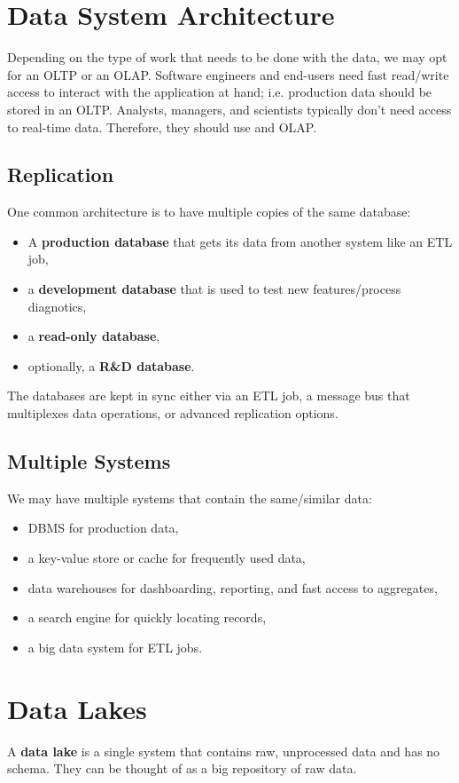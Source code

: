 \documentclass{report}
\newenvironment{definition}[1]{\begin{tcolorbox}[title={Definition: #1}]}{\end{tcolorbox}}
\renewcommand{\bf}[1]{\textbf{{#1}}}
\begin{document}
\section{Data System Architecture}
Depending on the type of work that needs to be done with the data, we may opt
for an OLTP or an OLAP. Software engineers and end-users need fast read/write
access to interact with the application at hand; i.e. production data should be
stored in an OLTP. Analysts, managers, and scientists typically don't need
access to real-time data. Therefore, they should use and OLAP.

\subsection{Replication}
One common architecture is to have multiple copies of the same database:
\begin{itemize}[label=$\to$]
    \item A \bf{production database} that gets its data from another system like
        an ETL job,
    \item a \bf{development database} that is used to test new features/process
        diagnotics,
    \item a \bf{read-only database},
    \item optionally, a \bf{R\&D database}.
\end{itemize}

The databases are kept in sync either via an ETL job, a message bus that
multiplexes data operations, or advanced replication options.

\subsection{Multiple Systems}
We may have multiple systems that contain the same/similar data:
\begin{itemize}[label=$\to$]
    \item DBMS for production data,
    \item a key-value store or cache for frequently used data,
    \item data warehouses for dashboarding, reporting, and fast access to
        aggregates,
    \item a search engine for quickly locating records,
    \item a big data system for ETL jobs.
\end{itemize}

\section{Data Lakes}
\begin{definition}{Data Lake}
    A \bf{data lake} is a single system that contains raw, unprocessed data and
    has no schema. They can be thought of as a big repository of raw data.
\end{definition}
\end{document}

